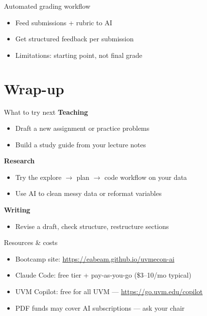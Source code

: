 \documentclass[aspectratio=169]{beamer}
\begin{document}
\begin{frame}{Automated grading workflow}
\begin{itemize}
    \item Feed submissions + rubric to AI
    \item Get structured feedback per submission
    \item Limitations: starting point, not final grade
\end{itemize}
\end{frame}

\section{Wrap-up}

\begin{frame}{What to try next}
\textbf{Teaching}
\begin{itemize}
    \item Draft a new assignment or practice problems
    \item Build a study guide from your lecture notes
\end{itemize}

\bigskip
\textbf{Research}
\begin{itemize}
    \item Try the explore $\rightarrow$ plan $\rightarrow$ code workflow on your data
    \item Use AI to clean messy data or reformat variables
\end{itemize}

\bigskip
\textbf{Writing}
\begin{itemize}
    \item Revise a draft, check structure, restructure sections
\end{itemize}
\end{frame}

\begin{frame}{Resources \& costs}
\begin{itemize}
    \item Bootcamp site: \url{https://eabeam.github.io/uvmecon-ai}
    \item Claude Code: free tier + pay-as-you-go (\$3--10/mo typical)
    \item UVM Copilot: free for all UVM --- \url{https://go.uvm.edu/copilot}
    \item PDF funds may cover AI subscriptions --- ask your chair
\end{itemize}
\end{frame}
\end{document}
